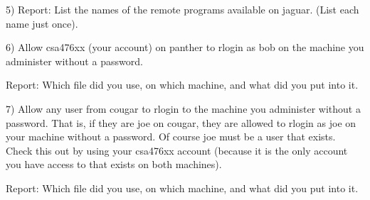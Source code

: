 5) Report: List the names of the remote programs available on {\ltt{}jaguar}.
(List each name just once).

6) Allow csa476xx (your account) on {\ltt{}panther} to rlogin as bob 
on the machine you administer without a password.

Report: Which file did you use, on which machine, and what did you put into it.

7) Allow any user from {\ltt{}cougar} to rlogin to the machine you administer 
without a password.
That is, if they are joe on {\ltt{}cougar}, they are allowed to rlogin as
joe on your
machine without a password. Of course joe must be  a user that exists.
Check this out by using your csa476xx account (because it is the only
account you have access to that exists on both machines).

Report: Which file did you use, on which machine, and what did you put into it.
\bye
